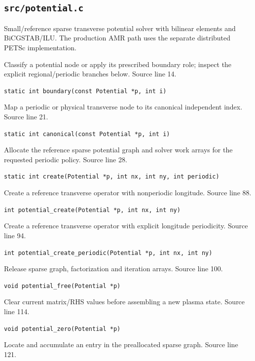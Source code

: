 \subsection{\texttt{src/potential.c}}
Small/reference sparse transverse potential solver with bilinear elements and BiCGSTAB/ILU. The production AMR path uses the separate distributed PETSc implementation.
\begin{description}[style=nextline,leftmargin=0pt,labelindent=0pt,labelwidth=0pt,labelsep=0pt]
\item[\texttt{boundary}] Classify a potential node or apply its prescribed boundary role; inspect the explicit regional/periodic branches below. Source line 14.\par
{\small\nolinkurl{static int boundary(const Potential *p, int i)}}
\item[\texttt{canonical}] Map a periodic or physical transverse node to its canonical independent index. Source line 21.\par
{\small\nolinkurl{static int canonical(const Potential *p, int i)}}
\item[\texttt{create}] Allocate the reference sparse potential graph and solver work arrays for the requested periodic policy. Source line 28.\par
{\small\nolinkurl{static int create(Potential *p, int nx, int ny, int periodic)}}
\item[\texttt{potential\_create}] Create a reference transverse operator with nonperiodic longitude. Source line 88.\par
{\small\nolinkurl{int potential_create(Potential *p, int nx, int ny)}}
\item[\texttt{potential\_create\_periodic}] Create a reference transverse operator with explicit longitude periodicity. Source line 94.\par
{\small\nolinkurl{int potential_create_periodic(Potential *p, int nx, int ny)}}
\item[\texttt{potential\_free}] Release sparse graph, factorization and iteration arrays. Source line 100.\par
{\small\nolinkurl{void potential_free(Potential *p)}}
\item[\texttt{potential\_zero}] Clear current matrix/RHS values before assembling a new plasma state. Source line 114.\par
{\small\nolinkurl{void potential_zero(Potential *p)}}
\item[\texttt{entry}] Locate and accumulate an entry in the preallocated sparse graph. Source line 121.\par

\end{description}
